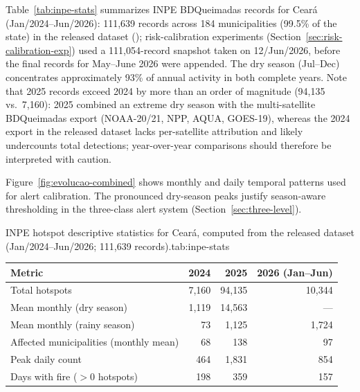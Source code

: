 Table~\ref{tab:inpe-stats} summarizes INPE BDQueimadas records for Cear\'{a} (Jan/2024--Jun/2026): 111{,}639 records across 184 municipalities (99.5\% of the state) in the released dataset (); risk-calibration experiments (Section~\ref{sec:risk-calibration-exp}) used a 111{,}054-record snapshot taken on 12/Jun/2026, before the final records for May--June 2026 were appended. The dry season (Jul--Dec) concentrates approximately 93\% of annual activity in both complete years. Note that 2025 records exceed 2024 by more than an order of magnitude (94{,}135 vs.\ 7{,}160): 2025 combined an extreme dry season with the multi-satellite BDQueimadas export (NOAA-20/21, NPP, AQUA, GOES-19), whereas the 2024 export in the released dataset lacks per-satellite attribution and likely undercounts total detections; year-over-year comparisons should therefore be interpreted with caution.

Figure~\ref{fig:evolucao-combined} shows monthly and daily temporal patterns used for alert calibration. The pronounced dry-season peaks justify season-aware thresholding in the three-class alert system (Section~\ref{sec:three-level}).

\begin{resulttable}{INPE hotspot descriptive statistics for Cear\'{a}, computed from the released dataset (Jan/2024--Jun/2026; 111{,}639 records).}{tab:inpe-stats}
\begin{tabular}{@{}lrrr@{}}
\toprule
\textbf{Metric} & \textbf{2024} & \textbf{2025} & \textbf{2026 (Jan--Jun)} \\
\midrule
Total hotspots & 7{,}160 & 94{,}135 & 10{,}344 \\
Mean monthly (dry season) & 1{,}119 & 14{,}563 & --- \\
Mean monthly (rainy season) & 73 & 1{,}125 & 1{,}724 \\
Affected municipalities (monthly mean) & 68 & 138 & 97 \\
Peak daily count & 464 & 1{,}831 & 854 \\
Days with fire ($>0$ hotspots) & 198 & 359 & 157 \\
\bottomrule
\end{tabular}
\end{resulttable}

